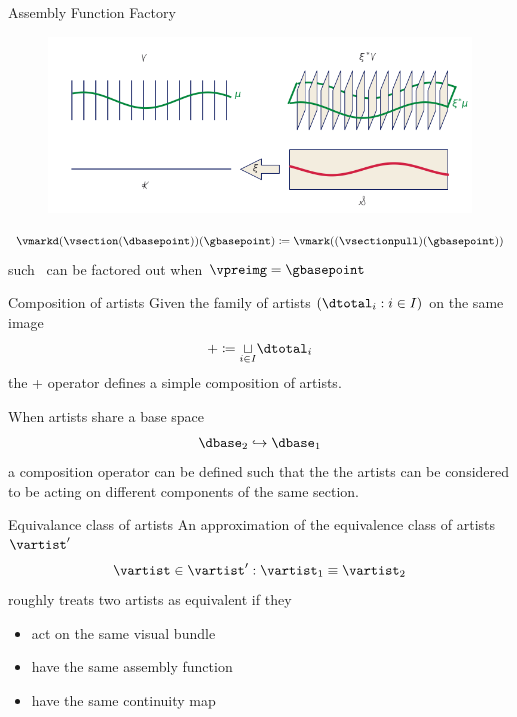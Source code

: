 \documentclass[xcolor={dvipsnames}, handout]{beamer}
\begin{document}
\begin{frame}{Assembly Function Factory}
\begin{figure}[H]
    \includegraphics[width=1\textwidth]{figures/math/q_hat.png}
\end{figure}
\begin{equation}\label{eq:qhat_q_s}
    \vmarkd(\vsection(\dbasepoint))(\gbasepoint) \coloneqq \vmark((\vsectionpull)(\gbasepoint))
\end{equation} 
such \gbasepoint\ can be factored out when $\vpreimg = \gbasepoint$
\end{frame}

\begin{frame}{Composition of artists}
    Given the family of artists $(\dtotal_i: i\in I)$ on the same image
    \begin{equation}
        + \coloneqq \underset{i\in I}{\sqcup} \dtotal_{i}
    \end{equation}
    the + operator defines a simple composition of artists. 

    When artists share a base space 
    \begin{equation}
        \dbase_2 \hookrightarrow \dbase_1
    \end{equation}
    a composition operator can be defined such that the the artists can be considered to be acting on different components of the same section. 
\end{frame}

\begin{frame}{Equivalance class of artists}
    An approximation of the equivalence class of artists $\vartist^{\prime}$
    \begin{equation}
    \vartist \in \vartist^{\prime}: \vartist_{1} \equiv \vartist_{2}
    \end{equation}
    roughly treats two artists as equivalent if they 
    \begin{itemize}
        \item act on the same visual bundle \vtotal
        \item have the same assembly function \vmark 
        \item have the same continuity map \vindex 
    \end{itemize}
\end{frame}
\end{document}
